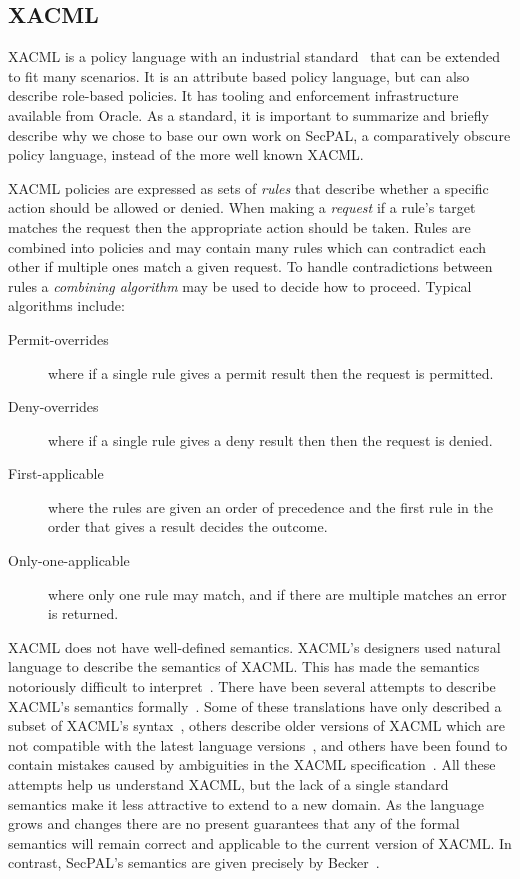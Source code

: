 \documentclass[thesis.tex]{subfiles}
\begin{document}
\subsection{XACML}

XACML is a policy language with an industrial
standard~\cite{oasis_extensible_2013} that can be extended to fit many
scenarios. It is an attribute based policy language, but can also describe
role-based policies. It has tooling and enforcement infrastructure available
from Oracle. As a standard, it is important to summarize and briefly describe
why we chose to base our own work on SecPAL, a comparatively obscure policy
language, instead of the more well known XACML.

XACML policies are expressed as sets of \emph{rules} that describe
whether a specific action should be allowed or denied. When making a
\emph{request} if a rule's target matches the request then the
appropriate action should be taken. Rules are combined into policies
and may contain many rules which can contradict each other if multiple
ones match a given request. To handle contradictions between rules a
\emph{combining algorithm} may be used to decide how to
proceed. Typical algorithms include:

\begin{description}
  \item[Permit-overrides] where if a single rule gives a permit result then the request is permitted.
  \item[Deny-overrides] where if a single rule gives a deny result then then the request is denied.
  \item[First-applicable] where the rules are given an order of precedence and the first rule in the order that gives a result decides the outcome.
  \item[Only-one-applicable] where only one rule may match, and if there are multiple matches an error is returned.
\end{description}

XACML does not have well-defined semantics. XACML's designers used natural
language to describe the semantics of XACML. This has made the semantics
notoriously difficult to interpret~\cite{ramli_detecting_2015}. There have been
several attempts to describe XACML's semantics
formally~\cite{ramli_xacml_2012,ramli_logic_2014,bryans_reasoning_2005}. Some of
these translations have only described a subset of XACML's
syntax~\cite{halpern_using_2008}, others describe older versions of XACML which
are not compatible with the latest language versions~\cite{ahn_reasoning_2010},
and others have been found to contain mistakes caused by ambiguities in the
XACML specification~\cite{bruns_access-control_2008,halpern_using_2008}. All
these attempts help us understand XACML, but the lack of a single standard
semantics make it less attractive to extend to a new domain. As the language
grows and changes there are no present guarantees that any of the formal
semantics will remain correct and applicable to the current version of XACML. In
contrast, SecPAL's semantics are given precisely by
Becker~\cite{becker_secpal:_2006}.
\end{document}

